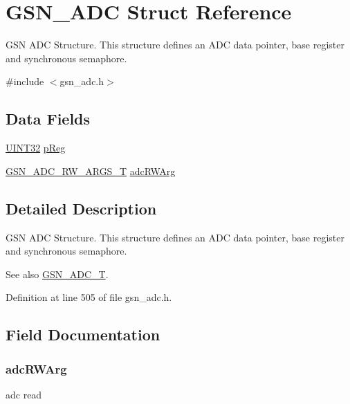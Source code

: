 \hypertarget{a00022}{
\section{GSN\_\-ADC Struct Reference}
\label{a00022}
}


GSN ADC Structure. This structure defines an ADC data pointer, base register and synchronous semaphore.  




{\ttfamily \#include $<$gsn\_\-adc.h$>$}

\subsection*{Data Fields}
\begin{DoxyCompactItemize}
\item 
\hyperlink{a00660_gae1e6edbbc26d6fbc71a90190d0266018}{UINT32} \hyperlink{a00022_a733fb7afbc3bd37a546de0e37c12f150}{pReg}
\item 
\hyperlink{a00025}{GSN\_\-ADC\_\-RW\_\-ARGS\_\-T} \hyperlink{a00022_afa35643fe8244b329fe3f27c20837b06}{adcRWArg}
\end{DoxyCompactItemize}


\subsection{Detailed Description}
GSN ADC Structure. This structure defines an ADC data pointer, base register and synchronous semaphore. 

\begin{DoxySeeAlso}{See also}
\hyperlink{a00643_ga9f5c392bf9244880ab92d22101c6131d}{GSN\_\-ADC\_\-T}. 
\end{DoxySeeAlso}


Definition at line 505 of file gsn\_\-adc.h.



\subsection{Field Documentation}
\hypertarget{a00022_afa35643fe8244b329fe3f27c20837b06}{
\subsubsection[{adcRWArg}]{ {\bf adcRWArg}}}
\label{a00022_afa35643fe8244b329fe3f27c20837b06}
adc read 

